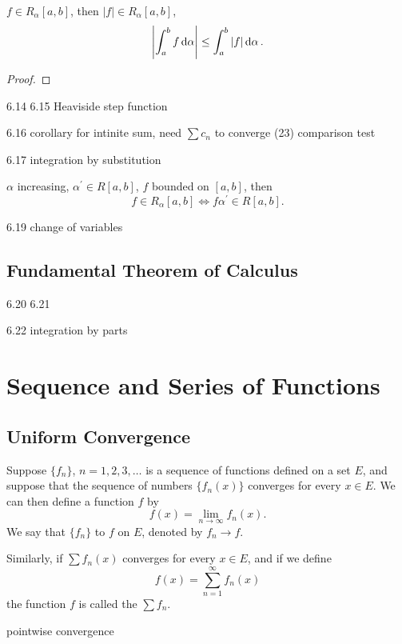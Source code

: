 \begin{theorem}
$f\in R_\alpha[a,b]$, then $|f|\in R_\alpha[a,b]$,
\[ \left|\int_a^bf\dd{\alpha}\right|\le\int_a^b|f|\dd{\alpha}. \]
\end{theorem}

\begin{proof}

\end{proof}

6.14 6.15
Heaviside step function

6.16 corollary
for intinite sum, need $\sum c_n$ to converge
(23) comparison test

6.17 integration by substitution
\begin{theorem}
$\alpha$ increasing, $\alpha^\prime\in R[a,b]$, $f$ bounded on $[a,b]$, then
\[ f\in R_\alpha[a,b]\iff f\alpha^\prime\in R[a,b]. \]
\end{theorem}

6.19 change of variables

\section{Fundamental Theorem of Calculus}
6.20 6.21

\begin{theorem}

\end{theorem}

6.22 integration by parts

\chapter{Sequence and Series of Functions}
\section{Uniform Convergence}
\begin{definition}
Suppose $\{f_n\}$, $n=1,2,3,\dots$ is a sequence of functions defined on a set $E$, and suppose that the sequence of numbers $\{f_n(x)\}$ converges for every $x\in E$. We can then define a function $f$ by
\[ f(x)=\lim_{n\to\infty}f_n(x). \]
We say that $\{f_n\}$  to $f$ on $E$, denoted by $f_n\to f$.

Similarly, if $\sum f_n(x)$ converges for every $x\in E$, and if we define
\[ f(x)=\sum_{n=1}^\infty f_n(x) \]
the function $f$ is called the  $\sum f_n$.
\end{definition}
pointwise convergence

